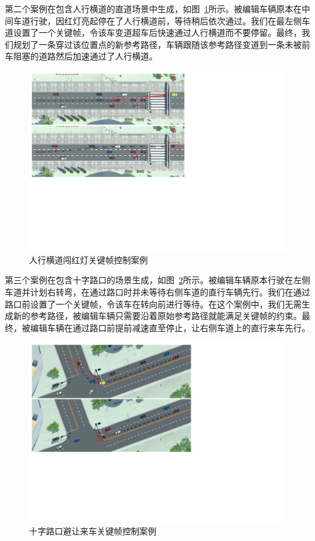 第二个案例在包含人行横道的直道场景中生成，如图~\ref{fig:keyframe_caseredlight}所示。被编辑车辆原本在中间车道行驶，因红灯亮起停在了人行横道前，等待稍后依次通过。我们在最左侧车道设置了一个关键帧，令该车变道超车后快速通过人行横道而不要停留。最终，我们规划了一条穿过该位置点的新参考路径，车辆跟随该参考路径变道到一条未被前车阻塞的道路然后加速通过了人行横道。

\begin{figure}[!tbh]
\centering
\includegraphics[width=0.82\columnwidth]{figure/keyframe/case_redlight_new_v2.pdf}
\caption[人行横道闯红灯关键帧控制案例]{
人行横道闯红灯关键帧控制案例
}
\label{fig:keyframe_caseredlight}
\end{figure}

第三个案例在包含十字路口的场景生成，如图~\ref{fig:keyframe_caseintersection}所示。被编辑车辆原本行驶在左侧车道并计划右转弯，在通过路口时并未等待右侧车道的直行车辆先行。我们在通过路口前设置了一个关键帧，令该车在转向前进行等待。在这个案例中，我们无需生成新的参考路径，被编辑车辆只需要沿着原始参考路径就能满足关键帧的约束。最终，被编辑车辆在通过路口前提前减速直至停止，让右侧车道上的直行来车先行。

\begin{figure}[!tbh]
\centering
\includegraphics[width=0.82\columnwidth]{figure/keyframe/case_intersection_new_v2.pdf}
\caption[十字路口避让来车关键帧控制案例]{
十字路口避让来车关键帧控制案例
}
\label{fig:keyframe_caseintersection}
\end{figure}



